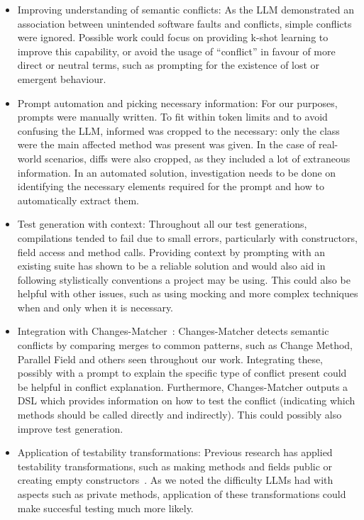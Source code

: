 \begin{itemize}
\item Improving understanding of semantic conflicts: As the LLM demonstrated an association between unintended software faults and conflicts, simple conflicts were ignored.
Possible work could focus on providing k-shot learning to improve this capability, or avoid the usage of ``conflict'' in favour of more direct or neutral terms, such as prompting
for the existence of lost or emergent behaviour.

\item Prompt automation and picking necessary information: For our purposes, prompts were manually written. To fit within token limits and to avoid confusing the LLM, informed was cropped to
the necessary: only the class were the main affected method was present was given. In the case of real-world scenarios, diffs were also cropped, as they included a lot of extraneous information.
In an automated solution, investigation needs to be done on identifying the necessary elements required for the prompt and how to automatically extract them.

\item Test generation with context: Throughout all our test generations, compilations tended to fail due to small errors, particularly with constructors, field access and method calls.
Providing context by prompting with an existing suite has shown to be a reliable solution and would also aid in following stylistically conventions a project may be using.
This could also be helpful with other issues, such as using mocking and more complex techniques when and only when it is necessary.

\item Integration with Changes-Matcher~\cite{kn:nuno}: Changes-Matcher detects semantic conflicts by comparing merges to common patterns, such as Change Method, Parallel Field and others
seen throughout our work. Integrating these, possibly with a prompt to explain the specific type of conflict present could be helpful in conflict explanation.
Furthermore, Changes-Matcher outputs a DSL which provides information on how to test the conflict (indicating which methods should be called directly and indirectly). This could possibly
also improve test generation.

\item Application of testability transformations: Previous research has applied testability transformations, such as making methods and fields public or creating empty constructors~\cite{kn:leuson}.
As we noted the difficulty LLMs had with aspects such as private methods, application of these transformations could make succesful testing much more likely.
\end{itemize}

